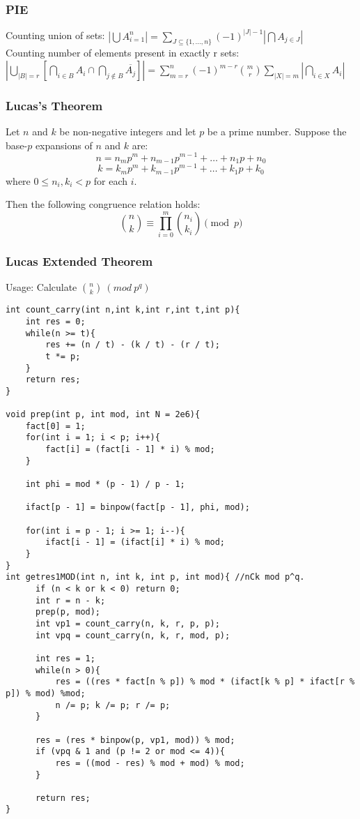 \subsubsection{PIE}
Counting union of sets: 
$|\bigcup A_{i=1}^n| = \sum_{J \subseteq \{1,...,n\}  } (-1)^{|J| - 1} |\bigcap A_{j \in J} |$  
\\Counting number of elements present in exactly r sets: 
$\left|\bigcup_{|B|=r}\left[\bigcap_{i \in B} A_i \cap \bigcap_{j \not\in B} \overline{A_j}\right]\right|=\sum_{m=r}^n (-1)^{m-r}\binom{m}{r} \sum_{|X|=m} \left|\bigcap_{i \in X} A_{i}\right|$

\subsubsection{Lucas's Theorem}
Let $n$ and $k$ be non-negative integers and let $p$ be a prime number.
Suppose the base-$p$ expansions of $n$ and $k$ are:
$$n = n_m p^m + n_{m-1} p^{m-1} + \dots + n_1 p + n_0$$
$$k = k_m p^m + k_{m-1} p^{m-1} + \dots + k_1 p + k_0$$
where $0 \le n_i, k_i < p$ for each $i$.

Then the following congruence relation holds:
$$ \binom{n}{k} \equiv \prod_{i=0}^{m} \binom{n_i}{k_i} \pmod{p} $$

\subsubsection{Lucas Extended Theorem}
Usage: Calculate $\binom{n}{k} \ (mod \ p^q)$
\begin{lstlisting}
int count_carry(int n,int k,int r,int t,int p){
    int res = 0;
    while(n >= t){
        res += (n / t) - (k / t) - (r / t);
        t *= p;
    }
    return res;
}

void prep(int p, int mod, int N = 2e6){
    fact[0] = 1;
    for(int i = 1; i < p; i++){
        fact[i] = (fact[i - 1] * i) % mod;
    }

    int phi = mod * (p - 1) / p - 1;

    ifact[p - 1] = binpow(fact[p - 1], phi, mod);

    for(int i = p - 1; i >= 1; i--){
        ifact[i - 1] = (ifact[i] * i) % mod;
    }
}
int getres1MOD(int n, int k, int p, int mod){ //nCk mod p^q.
      if (n < k or k < 0) return 0;
      int r = n - k;
      prep(p, mod);
      int vp1 = count_carry(n, k, r, p, p);
      int vpq = count_carry(n, k, r, mod, p);
      
      int res = 1;
      while(n > 0){
          res = ((res * fact[n % p]) % mod * (ifact[k % p] * ifact[r % p]) % mod) %mod;
          n /= p; k /= p; r /= p;
      }

      res = (res * binpow(p, vp1, mod)) % mod;
      if (vpq & 1 and (p != 2 or mod <= 4)){
          res = ((mod - res) % mod + mod) % mod;
      }

      return res;
}
\end{lstlisting}

